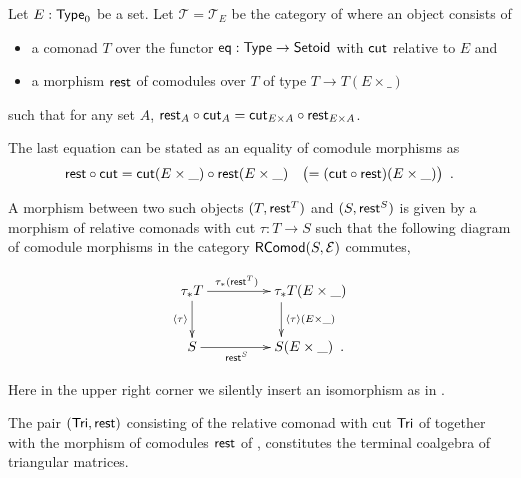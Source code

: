 \documentclass[envcountsame]{llncs}
\begin{document}
\begin{definition}%
\label{def:cat_tri}
   Let $E:\mathsf{Type}_0$ be a set.
   Let $\mathcal{T} = \mathcal{T}_E$ be the category of  where an object consists of
   \begin{itemize}
    \item a comonad $T$ over the functor $\mathsf{eq}:\mathsf{Type}\to\mathsf{Setoid}$ with $\mathsf{cut}$ relative to $E$ and
    \item a morphism $\mathsf{rest}$ of comodules over $T$ of type $T \to T(E\times \_)$
   \end{itemize}
   such that for any set $A$,
    $ {\mathsf{rest}_A} \circ {\ensuremath{\mathsf{cut}}_A} = {\mathsf{cut}_{E\times A}} \circ {\ensuremath{\mathsf{rest}}_{E\times A}}$.
    
 \begin{Long}
   The last equation can be stated as an equality of comodule morphisms as
     \[ {\mathsf{rest}} \circ {\ensuremath{\mathsf{cut}}} = {\mathsf{cut}(E\times\_)} \circ {\ensuremath{\mathsf{rest}}(E\times \_)} \quad \bigl( = ({\mathsf{cut}} \circ {\ensuremath{\mathsf{rest}}})(E\times \_)\bigr)\enspace . \]
\end{Long}
  
   
   A morphism between two such objects $(T,\mathsf{rest}^T)$ and $(S,\mathsf{rest}^S)$
   is given by a morphism of relative comonads with cut $\tau : T \to S$ such that
   the following diagram of comodule morphisms in the category $\mathsf{RComod}(S,\mathcal{E})$ commutes,
   
   \[ \begin{xy}
       \xymatrix{   \tau_*T  \ar[r]^{\tau_*(\tail^T)} \ar[d]_{\induced{\tau}}  &  **[r] \tau_*T (E\times \_ )\ar[d]^{\induced{\tau}(E\times \_)} \\
                    S  \ar[r]_{\tail^S}  &  **[r] S (E\times \_ ) \enspace .
        }
      \end{xy}
   \]

   \noindent
   Here in the upper right corner we silently insert an isomorphism as in .
\end{definition}   
   

\begin{theorem}\label{ex:final_sem_tri} %
   The pair $(\mathsf{Tri}, \mathsf{rest})$ consisting of the relative comonad with cut $\mathsf{Tri}$ of  together with 
    the morphism of comodules $\mathsf{rest}$ of ,
   constitutes the terminal coalgebra of triangular matrices.
\end{theorem}
\end{document}
